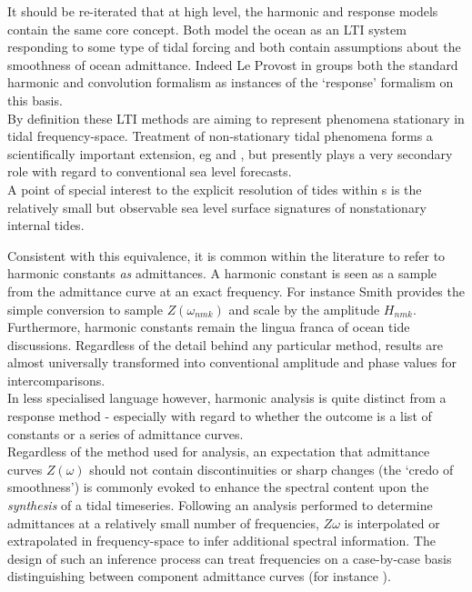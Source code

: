 It should be re-iterated that at high level, the harmonic and response models contain the same core concept.   Both model the ocean as an LTI system responding to some type of tidal forcing and both contain assumptions about the smoothness of ocean admittance.  Indeed Le Provost in \citep[chpt6]{Fu:2001ub} groups both the standard harmonic and convolution formalism as instances of the `response' formalism on this basis. \\
By definition these LTI methods are aiming to represent phenomena stationary in tidal frequency-space.  Treatment of non-stationary tidal phenomena forms a scientifically important extension, eg \citep{Colosi:2006va} and \citep{Ray:2011tj}, but presently plays a very secondary role with regard to conventional sea level forecasts.\\
A point of special interest to the explicit resolution of tides within \OGCM{}s is the relatively small but observable sea level surface signatures of nonstationary internal tides.




Consistent with this equivalence, it is common within the literature to refer to harmonic constants \emph{as} admittances.   A harmonic constant is seen as a sample from the admittance curve at an exact frequency. For instance Smith\cite{Smith:1997ut} provides the simple conversion to sample $Z(\omega_{nmk})$ and scale by the \ATGP{} amplitude $H_{nmk}$.
Furthermore, harmonic constants remain the lingua franca of ocean tide discussions. Regardless of the detail behind any particular method, results are almost universally transformed into conventional amplitude and phase values for intercomparisons.\\
In less specialised language however, harmonic analysis is quite distinct from a response method - especially with regard to whether the outcome is a list of constants or a series of admittance curves.\\




Regardless of the method used for analysis, an expectation that admittance curves $Z(\omega)$ should not contain discontinuities or sharp changes (the `credo of smoothness') is commonly evoked to enhance the spectral content upon the \emph{synthesis} of a tidal timeseries.  Following an analysis performed to determine admittances at a relatively small number of frequencies, $Z{\omega}$ is interpolated or extrapolated in frequency-space to infer additional spectral information.   The design of such an inference process can treat frequencies on a case-by-case basis distinguishing between component admittance curves (for instance \citep[pp 268]{Fu:2001ub}).





